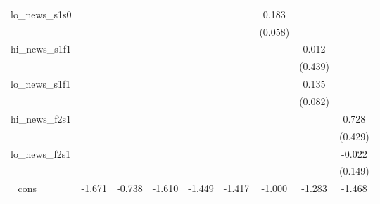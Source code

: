 {\begin{tabular}{l*{8}{c}}
\addlinespace
lo\_news\_s1s0&                     &                     &                     &                     &                     &       0.183\sym{***}&                     &                     \\
            &                     &                     &                     &                     &                     &     (0.058)         &                     &                     \\
\addlinespace
hi\_news\_s1f1&                     &                     &                     &                     &                     &                     &       0.012         &                     \\
            &                     &                     &                     &                     &                     &                     &     (0.439)         &                     \\
\addlinespace
lo\_news\_s1f1&                     &                     &                     &                     &                     &                     &       0.135         &                     \\
            &                     &                     &                     &                     &                     &                     &     (0.082)         &                     \\
\addlinespace
hi\_news\_f2s1&                     &                     &                     &                     &                     &                     &                     &       0.728         \\
            &                     &                     &                     &                     &                     &                     &                     &     (0.429)         \\
\addlinespace
lo\_news\_f2s1&                     &                     &                     &                     &                     &                     &                     &      -0.022         \\
            &                     &                     &                     &                     &                     &                     &                     &     (0.149)         \\
\addlinespace
\_cons      &      -1.671\sym{***}&      -0.738         &      -1.610\sym{***}&      -1.449\sym{***}&      -1.417\sym{***}&      -1.000\sym{***}&      -1.283\sym{***}&      -1.468\sym{***}\\

\end{tabular}}
